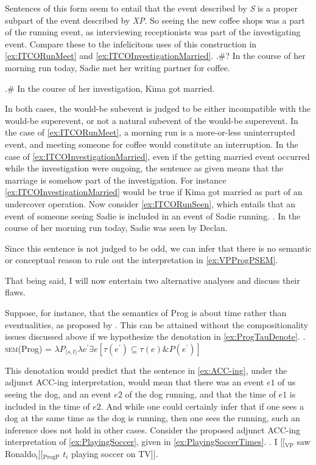 \documentclass[MilwayThesis]{subfiles}
\begin{document}
Sentences of this form seem to entail that the event described by \textit{S} is a proper subpart of the event described by \textit{XP}.
So seeing the new coffee shops was a part of the running event, as interviewing receptionists was part of the investigating event.
Compare these to the infelicitous uses of this construction in \cref{ex:ITCORunMeet} and \cref{ex:ITCOInvestigationMarried}.
\ex.\#? In the course of her morning run today, Sadie met her writing partner for coffee.\label{ex:ITCORunMeet}

\ex.\# In the course of her investigation, Kima got married.\label{ex:ITCOInvestigationMarried}

In both cases, the would-be subevent is judged to be either incompatible with the would-be superevent, or not a natural subevent of the would-be superevent.
In the case of \cref{ex:ITCORunMeet}, a morning run is a more-or-less uninterrupted event, and meeting someone for coffee would constitute an interruption.
In the case of \cref{ex:ITCOInvestigationMarried}, even if the getting married event occurred while the investigation were ongoing, the sentence as given means that the marriage is somehow part of the investigation.
For instance \cref{ex:ITCOInvestigationMarried} would be true if Kima got married as part of an undercover operation.
Now consider \cref{ex:ITCORunSeen}, which entails that an event of someone seeing Sadie is included in an event of Sadie running.
\ex.\label{ex:ITCORunSeen} In the course of her morning run today, Sadie was seen by Declan.

Since this sentence is not judged to be odd, we can infer that there is no semantic or conceptual reason to rule out the interpretation in \cref{ex:VPProgPSEM}.

That being said, I will now entertain two alternative analyses and discuss their flaws.

Suppose, for instance, that the semantics of Prog is about time rather than eventualities, as proposed by \textcite{klein1994time}.
This can be attained without the compositionality issues discussed above if we hypothesize the denotation in \cref{ex:ProgTauDenote}.
\ex.\label{ex:ProgTauDenote} \textsc{sem}(Prog) = $\lambda P_{\langle s,t\rangle} \lambda e^{\prime} \exists e [\tau(e^{\prime}) \subseteq \tau(e) \& P(e^{\prime})]$

This denotation would predict that the sentence in \cref{ex:ACC-ing}, under the adjunct ACC-ing interpretation, would mean that there was an event $e1$ of us seeing the dog, and an event $e2$ of the dog running, and that the time of $e1$ is included in the time of $e2$.
And while one could certainly infer that if one sees a dog at the same time as the dog is running, then one sees the running, such an inference does not hold in other cases.
Consider the proposed adjunct ACC-ing interpretation of \cref{ex:PlayingSoccer}, given in \cref{ex:PlayingSoccerTimes}.
\ex.\label{ex:PlayingSoccer} I [[$_{\text{VP}}$ saw Ronaldo$_{i}$][$_{\text{ProgP}}$ $t_{i}$ playing soccer on TV]].
\end{document}

